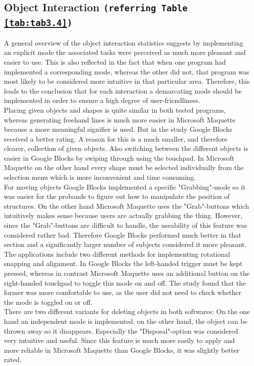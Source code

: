 \documentclass{report}
\begin{document}
		\subsection[Object Interaction]{Object Interaction \small{\texttt{(referring Table \ref{tab:tab3.4})}}}
			A general overview of the object interaction statistics suggests by implementing an explicit mode the associated tasks were perceived as much more pleasant and easier to use. This is also reflected in the fact that when one program had implemented a corresponding mode, whereas the other did not, that program was most likely to be considered more intuitive in that particular area. Therefore, this leads to the conclusion that for each interaction a demarcating mode should be implemented in order to ensure a high degree of user-friendliness. \\
			Placing given objects and shapes is quite similar in both tested programs, whereas generating freehand lines is much more easier in Microsoft Maquette because a more meaningful signifier is used. But in the study Google Blocks received a better rating. A reason for this is a much smaller, and therefore clearer, collection of given objects. Also switching between the different objects is easier in Google Blocks by swiping through using the touchpad. In Microsoft Maquette on the other hand every shape must be selected individually from the selection menu which is more inconvenient and time consuming. \\
			For moving objects Google Blocks implemented a specific "Grabbing"-mode so it was easier for the probands to figure out how to manipulate the position of structures. On the other hand Microsoft Maquette uses the "Grab"-buttons which intuitively makes sense because users are actually grabbing the thing. However, since the "Grab"-buttons are difficult to handle, the useability of this feature was considered rather bad. Therefore Google Blocks performed much better in that section and a significantly larger number of subjects considered it more pleasant. \\
			The applications include two different methods for implementing rotational snapping and alignment. In Google Blocks the left-handed trigger must be kept pressed, whereas in contrast Microsoft Maquette uses an additional button on the right-handed touchpad to toggle this mode on and off. The study found that the former was more comfortable to use, as the user did not need to check whether the mode is toggled on or off. \\
			There are two different variants for deleting objects in both softwares: On the one hand an independent mode is implemented, on the other hand, the object can be thrown away so it disappears. Especially the "Disposal"-option was considered very intuitive and useful. Since this feature is much more easily to apply and more reliable in Microsoft Maquette than Google Blocks, it was slightly better rated. \\
\end{document}
